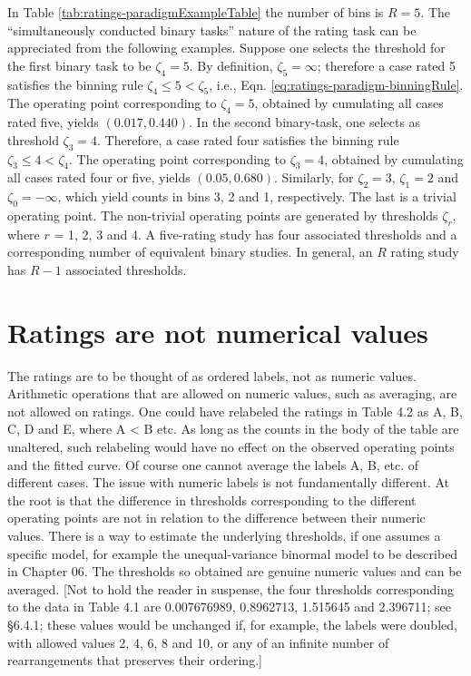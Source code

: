\documentclass[
]{book}
\begin{document}
In Table \ref{tab:ratings-paradigmExampleTable} the number of bins is \(R = 5\). The ``simultaneously conducted binary tasks'' nature of the rating task can be appreciated from the following examples. Suppose one selects the threshold for the first binary task to be \(\zeta_4 = 5\). By definition, \(\zeta_5 = \infty\); therefore a case rated 5 satisfies the binning rule \(\zeta_4 \leq 5 < \zeta_5\), i.e., Eqn. \eqref{eq:ratings-paradigm-binningRule}. The operating point corresponding to \(\zeta_4 = 5\), obtained by cumulating all cases rated five, yields \((0.017, 0.440)\). In the second binary-task, one selects as threshold \(\zeta_3 = 4\). Therefore, a case rated four satisfies the binning rule \(\zeta_3 \leq 4 < \zeta_4\). The operating point corresponding to \(\zeta_3 = 4\), obtained by cumulating all cases rated four or five, yields \((0.05, 0.680)\). Similarly, for \(\zeta_2 = 3\), \(\zeta_1 = 2\) and \(\zeta_0 = -\infty\), which yield counts in bins 3, 2 and 1, respectively. The last is a trivial operating point. The non-trivial operating points are generated by thresholds \(\zeta_r\), where \(r\) = 1, 2, 3 and 4. A five-rating study has four associated thresholds and a corresponding number of equivalent binary studies. In general, an \(R\) rating study has \(R-1\) associated thresholds.

\hypertarget{binary-task-ratings-not-numerical-values}{%
\section{Ratings are not numerical values}\label{binary-task-ratings-not-numerical-values}}

The ratings are to be thought of as ordered labels, not as numeric values. Arithmetic operations that are allowed on numeric values, such as averaging, are not allowed on ratings. One could have relabeled the ratings in Table 4.2 as A, B, C, D and E, where A \textless{} B etc. As long as the counts in the body of the table are unaltered, such relabeling would have no effect on the observed operating points and the fitted curve. Of course one cannot average the labels A, B, etc. of different cases. The issue with numeric labels is not fundamentally different. At the root is that the difference in thresholds corresponding to the different operating points are not in relation to the difference between their numeric values. There is a way to estimate the underlying thresholds, if one assumes a specific model, for example the unequal-variance binormal model to be described in Chapter 06. The thresholds so obtained are genuine numeric values and can be averaged. {[}Not to hold the reader in suspense, the four thresholds corresponding to the data in Table 4.1 are 0.007676989, 0.8962713, 1.515645 and 2.396711; see §6.4.1; these values would be unchanged if, for example, the labels were doubled, with allowed values 2, 4, 6, 8 and 10, or any of an infinite number of rearrangements that preserves their ordering.{]}
\end{document}
